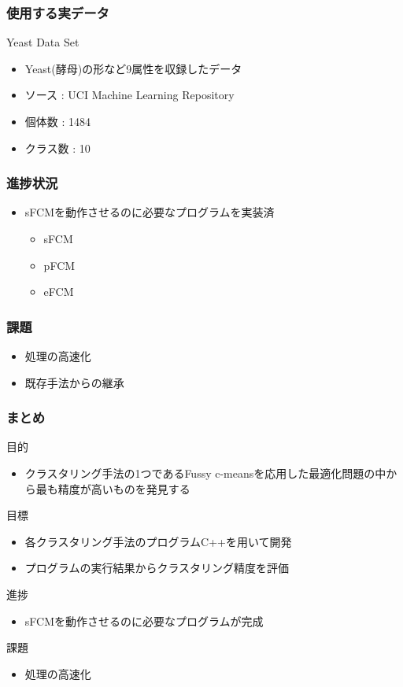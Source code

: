 \documentclass[13pt,dvipdfmx]{beamer}
\begin{document}
\begin{frame}\frametitle{使用する実データ}
  \begin{block}{Yeast Data Set}
    \begin{itemize}
    \item Yeast(酵母)の形など9属性を収録したデータ
    \item ソース : UCI  Machine Learning Repository
    \item 個体数 : 1484
    \item クラス数 : 10
    \end{itemize}
  \end{block}
\end{frame}

\begin{frame}\frametitle{進捗状況}
\begin{itemize}
 \item sFCMを動作させるのに必要なプログラムを実装済
       \begin{itemize}
       \item sFCM
       \item pFCM
       \item eFCM
       \end{itemize}
\end{itemize}
\end{frame}

\begin{frame}\frametitle{課題}
\begin{itemize}
\item 処理の高速化
\item 既存手法からの継承
\end{itemize}
\end{frame}

\begin{frame}\frametitle{まとめ}
  \begin{block}{目的}
    \begin{itemize}
    \item クラスタリング手法の1つであるFussy c-meansを応用した最適化問題の中から最も精度が高いものを発見する
    \end{itemize}
  \end{block}
  \begin{block}{目標}
    \begin{itemize}
    \item 各クラスタリング手法のプログラムC++を用いて開発
    \item プログラムの実行結果からクラスタリング精度を評価
    \end{itemize}
  \end{block}
  \begin{block}{進捗}
    \begin{itemize}
    \item sFCMを動作させるのに必要なプログラムが完成
    \end{itemize}
  \end{block}
  \begin{block}{課題}
    \begin{itemize}
    \item 処理の高速化
    \end{itemize}
  \end{block}
\end{frame}
\end{document}
